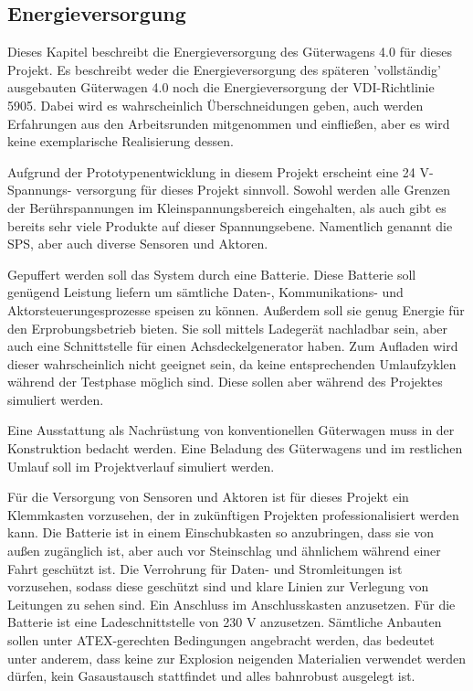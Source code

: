 \subsection{Energieversorgung}
Dieses Kapitel beschreibt die Energieversorgung des Güterwagens 4.0 für dieses Projekt. Es beschreibt weder die Energieversorgung des späteren 'vollständig' ausgebauten Güterwagen 4.0  noch die Energieversorgung der VDI-Richtlinie 5905. Dabei wird es wahrscheinlich Überschneidungen geben, auch werden Erfahrungen aus den Arbeitsrunden mitgenommen und einfließen, aber es wird keine exemplarische Realisierung dessen.\par
Aufgrund der Prototypenentwicklung in diesem Projekt erscheint eine 24 V-Spannungs- versorgung für dieses Projekt sinnvoll. Sowohl werden alle Grenzen der Berührspannungen im Kleinspannungsbereich eingehalten, als auch gibt es bereits sehr viele Produkte auf dieser Spannungsebene. Namentlich genannt die SPS, aber auch diverse Sensoren und Aktoren.\par
Gepuffert werden soll das System durch eine Batterie. Diese Batterie soll genügend Leistung liefern um sämtliche Daten-, Kommunikations- und Aktorsteuerungesprozesse speisen zu können. Außerdem soll sie genug Energie für den Erprobungsbetrieb bieten. Sie soll mittels Ladegerät nachladbar sein, aber auch eine Schnittstelle für einen Achsdeckelgenerator haben. Zum Aufladen wird dieser wahrscheinlich nicht geeignet sein, da keine entsprechenden Umlaufzyklen während der Testphase möglich sind. Diese sollen aber während des Projektes simuliert werden.\par
Eine Ausstattung als Nachrüstung von konventionellen Güterwagen muss in der Konstruktion bedacht werden. Eine Beladung des Güterwagens und im restlichen Umlauf soll im Projektverlauf simuliert werden.\par
Für die Versorgung von Sensoren und Aktoren ist für dieses Projekt ein Klemmkasten vorzusehen, der in zukünftigen Projekten professionalisiert werden kann. Die Batterie ist in einem Einschubkasten so anzubringen, dass sie von außen zugänglich ist, aber auch vor Steinschlag und ähnlichem während einer Fahrt geschützt ist. Die Verrohrung für Daten- und Stromleitungen ist vorzusehen, sodass diese geschützt sind und klare Linien zur Verlegung von Leitungen zu sehen sind. Ein Anschluss im Anschlusskasten anzusetzen. Für die Batterie ist eine Ladeschnittstelle von 230 V anzusetzen. Sämtliche Anbauten sollen unter ATEX-gerechten Bedingungen angebracht werden, das bedeutet unter anderem, dass keine zur Explosion neigenden Materialien verwendet werden dürfen, kein Gasaustausch stattfindet und alles bahnrobust ausgelegt ist.\par
